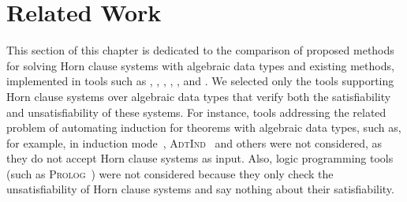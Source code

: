 \section{Related Work}\label{ch:relatedWork}

This section of this chapter is dedicated to the comparison of proposed methods for solving Horn clause systems with algebraic data types and existing methods, implemented in tools such as \spacer{}, \racer{}, \eldarica{}, \vericat{}, \hoice{}, and \rchc{}. We selected only the tools supporting Horn clause systems over algebraic data types that verify both the satisfiability and unsatisfiability of these systems. For instance, tools addressing the related problem of automating induction for theorems with algebraic data types, such as, for example, \cvc{} in induction mode~\cite{reynolds2015induction}, \textsc{AdtInd}~\cite{10.1007/978-3-030-30048-7_35} and others were not considered, as they do not accept Horn clause systems as input. Also, logic programming tools (such as \textsc{Prolog}~\cite{ClocksinMellish03}) were not considered because they only check the unsatisfiability of Horn clause systems and say nothing about their satisfiability.

